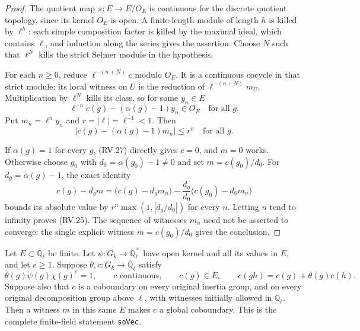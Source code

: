 \begin{proof}
The quotient map $\pi:E\to E/O_E$ is continuous for the discrete
quotient topology, since its kernel $O_E$ is open.
A finite-length module of length $h$ is killed by $\ell^h$:
each simple composition factor is killed by the maximal ideal,
which contains $\ell$, and induction along the series gives
the assertion.  Choose $N$ such that $\ell^N$ kills the strict
Selmer module in the hypothesis.

For each $n\ge0$, reduce
$\ell^{-(n+N)}c$ modulo $O_E$.
It is a continuous cocycle in that strict module; its local
witness on $U$ is the reduction of $\ell^{-(n+N)}m_U$.
Multiplication by $\ell^N$ kills its class, so for some $y_n\in E$
\[
            \ell^{-n}c(g)-(\alpha(g)-1)y_n\in O_E
                         \quad\text{for all }g.
 \tag{RV.26}
\]
Put $m_n=\ell^n y_n$ and $r=|\ell|=\ell^{-1}<1$.
Then
\[
                 |c(g)-(\alpha(g)-1)m_n|\le r^n
                         \quad\text{for all }g.
 \tag{RV.27}
\]

If $\alpha(g)=1$ for every $g$, (RV.27) directly gives $c=0$,
and $m=0$ works.
Otherwise choose $g_0$ with $d_0=\alpha(g_0)-1\ne0$ and set
$m=c(g_0)/d_0$.
For $d_g=\alpha(g)-1$, the exact identity
\[
 c(g)-d_gm
   =\big(c(g)-d_gm_n\big)
        -\frac{d_g}{d_0}\big(c(g_0)-d_0m_n\big)
 \tag{RV.28}
\]
bounds its absolute value by
$r^n\max(1,|d_g/d_0|)$ for every $n$.
Letting $n$ tend to infinity proves (RV.25).
The sequence of witnesses $m_n$ need not be asserted to converge:
the single explicit witness $m=c(g_0)/d_0$ gives the conclusion.
\end{proof}

\begin{proposition}
\label{claim:RV6}
Let $E\subset\overline{\mathbb Q}_\ell$ be finite.
Let $\psi:G_k\to\overline{\mathbb Q}_\ell^\times$ have open
kernel and all its values in $E$, and let $e\ge1$.
Suppose $\theta,c:G_k\to\overline{\mathbb Q}_\ell$ satisfy
\[
 \theta(g)\psi(g)\chi(g)^e=1,\qquad
 c\text{ continuous},\qquad c(g)\in E,\qquad
 c(gh)=c(g)+\theta(g)c(h).
 \tag{RV.29}
\]
Suppose also that $c$ is a coboundary on every original inertia
group, and on every original decomposition group above $\ell$,
with witnesses initially allowed in $\overline{\mathbb Q}_\ell$.
Then a witness $m$ in this same $E$ makes $c$ a global coboundary.
This is the complete finite-field statement \texttt{soVec}.
\end{proposition}

